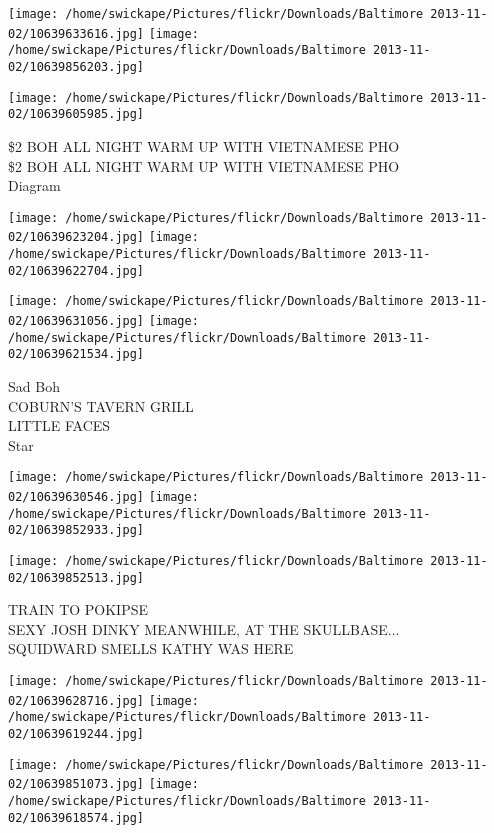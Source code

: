 \documentclass[10pt,letterpaper]{article}
\begin{document}
\texttt{[image: /home/swickape/Pictures/flickr/Downloads/Baltimore 2013-11-02/10639633616.jpg]}
\texttt{[image: /home/swickape/Pictures/flickr/Downloads/Baltimore 2013-11-02/10639856203.jpg]}

\vspace{0.25in}
\texttt{[image: /home/swickape/Pictures/flickr/Downloads/Baltimore 2013-11-02/10639605985.jpg]}

\$2 BOH ALL NIGHT WARM UP WITH VIETNAMESE PHO\\
\$2 BOH ALL NIGHT WARM UP WITH VIETNAMESE PHO\\
Diagram
\pagebreak

\texttt{[image: /home/swickape/Pictures/flickr/Downloads/Baltimore 2013-11-02/10639623204.jpg]}
\texttt{[image: /home/swickape/Pictures/flickr/Downloads/Baltimore 2013-11-02/10639622704.jpg]}

\texttt{[image: /home/swickape/Pictures/flickr/Downloads/Baltimore 2013-11-02/10639631056.jpg]}
\texttt{[image: /home/swickape/Pictures/flickr/Downloads/Baltimore 2013-11-02/10639621534.jpg]}

Sad Boh\\
COBURN'S TAVERN GRILL\\
LITTLE FACES\\
Star
\pagebreak

\texttt{[image: /home/swickape/Pictures/flickr/Downloads/Baltimore 2013-11-02/10639630546.jpg]}
\texttt{[image: /home/swickape/Pictures/flickr/Downloads/Baltimore 2013-11-02/10639852933.jpg]}

\vspace{0.25in}
\texttt{[image: /home/swickape/Pictures/flickr/Downloads/Baltimore 2013-11-02/10639852513.jpg]}

TRAIN TO POKIPSE\\
SEXY JOSH DINKY MEANWHILE, AT THE SKULLBASE...\\
SQUIDWARD SMELLS KATHY WAS HERE
\pagebreak

\texttt{[image: /home/swickape/Pictures/flickr/Downloads/Baltimore 2013-11-02/10639628716.jpg]}
\texttt{[image: /home/swickape/Pictures/flickr/Downloads/Baltimore 2013-11-02/10639619244.jpg]}

\texttt{[image: /home/swickape/Pictures/flickr/Downloads/Baltimore 2013-11-02/10639851073.jpg]}
\texttt{[image: /home/swickape/Pictures/flickr/Downloads/Baltimore 2013-11-02/10639618574.jpg]}
\end{document}
